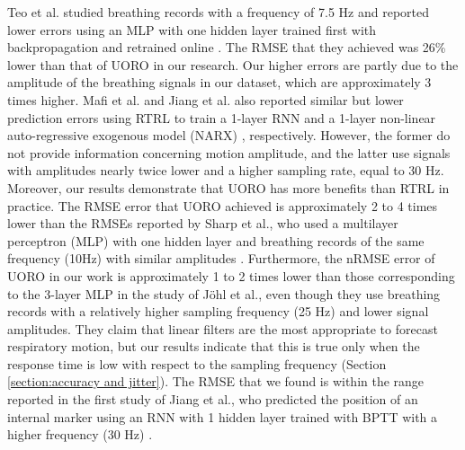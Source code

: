 \documentclass[twocolumn,a4paper]{svjour3} \sloppy          \smartqed
\begin{document}
Teo et al. studied breathing records with a frequency of 7.5 Hz and reported lower errors using an MLP with one hidden layer trained first with backpropagation and retrained online \cite{teo2018feasibility}. The RMSE that they achieved was 26\% lower than that of UORO in our research. Our higher errors are partly due to the amplitude of the breathing signals in our dataset, which are approximately 3 times higher. Mafi et al. and Jiang et al. also reported similar but lower prediction errors using RTRL to train a 1-layer RNN \cite{mafi2020real} and a 1-layer non-linear auto-regressive exogenous model (NARX) \cite{jiang2019prediction}, respectively. However, the former do not provide information concerning motion amplitude, and the latter use signals with amplitudes nearly twice lower and a higher sampling rate, equal to 30 Hz. Moreover, our results demonstrate that UORO has more benefits than RTRL in practice. The RMSE error that UORO achieved is approximately 2 to 4 times lower than the RMSEs reported by Sharp et al., who used a multilayer perceptron (MLP) with one hidden layer and breathing records of the same frequency (10Hz) with similar amplitudes \cite{sharp2004prediction}. Furthermore, the nRMSE error of UORO in our work is approximately 1 to 2 times lower than those corresponding to the 3-layer MLP in the study of Jöhl et al.,  even though they use breathing records with a relatively higher sampling frequency (25 Hz) and lower signal amplitudes. They claim that linear filters are the most appropriate to forecast respiratory motion, but our results indicate that this is true only when the response time is low with respect to the sampling frequency (Section \ref{section:accuracy and jitter}). The RMSE that we found is within the range reported in the first study of Jiang et al., who predicted the position of an internal marker using an RNN with 1 hidden layer trained with BPTT with a higher frequency (30 Hz) \cite{kai2018prediction}. 
\end{document}
